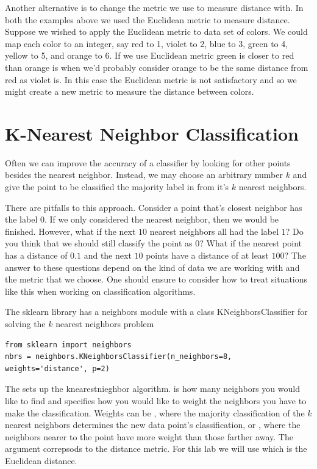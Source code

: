 Another alternative is to change the metric we use to measure distance with. 
In both the examples above we used the Euclidean metric to measure distance. 
Suppose we wished to apply the Euclidean metric to data set of colors.
We could map each color to an integer, say red to 1, violet to 2, blue to 3, green to 4, yellow to 5, and orange to 6. 
If we use Euclidean metric green is closer to red than orange is when we'd probably consider orange to be the same distance from red as violet is. 
In this case the Euclidean metric is not satisfactory and so we might create a new metric to measure the distance between colors. 

\section*{K-Nearest Neighbor Classification}
Often we can improve the accuracy of a classifier by looking for other points besides the nearest neighbor.  
Instead, we may choose an arbitrary number $k$ and give the point to be classified the majority label in from it's $k$ nearest neighbors. 

There are pitfalls to this approach.  
Consider a point that's closest neighbor has the label $0$.  
If we only considered the nearest neighbor, then we would be finished.  
However, what if the next $10$ nearest neighbors all had the label $1$?  
Do you think that we should still classify the point as $0$?  
What if the nearest point has a distance of $0.1$ and the next $10$ points have a distance of at least $100$?  
The answer to these questions depend on the kind of data we are working with and the metric that we choose.  
One should ensure to consider how to treat situations like this when working on classification algorithms.


The sklearn library has a neighbors module with a class KNeighborsClassifier for solving the $k$ nearest neighbors problem
\begin{lstlisting}
from sklearn import neighbors
nbrs = neighbors.KNeighborsClassifier(n_neighbors=8, weights='distance', p=2)
\end{lstlisting}

The  sets up the knearestnieghbor algorithm. 
 is how many neighbors you would like to find and  specifies how you would like to weight the neighbors you have to make the classification. 
Weights can be , where the majority classification of the $k$ nearest neighbors determines the new data point's classification, or , where the neighbors nearer to the point have more weight than those farther away. 
The argument  correpsods to the distance metric. 
For this lab we will use  which is the Euclidean distance.  

